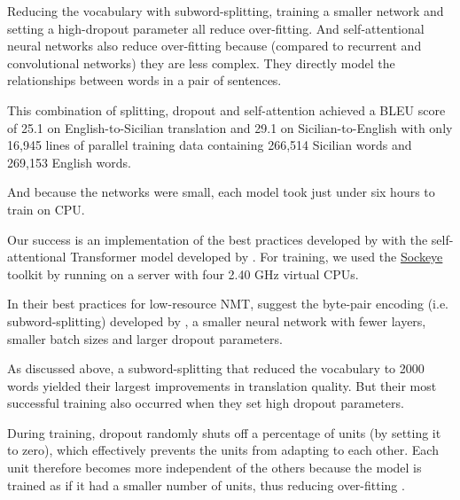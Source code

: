 \documentclass[10pt,letterpaper]{article}
\begin{document}
Reducing the vocabulary with subword-splitting,
training a smaller network and setting a high-dropout parameter all reduce over-fitting.
And self-attentional neural networks also reduce over-fitting because
(compared to recurrent and convolutional networks) they are less complex.  They
directly model the relationships between words in a pair of sentences.

This combination of splitting, dropout and self-attention achieved a BLEU score of
25.1 on English-to-Sicilian translation and 29.1 on Sicilian-to-English with only 16,945 lines
of parallel training data containing 266,514 Sicilian words and 269,153 English words.

And because the networks were small, each model took just under six hours to train on CPU.
      
Our success is an implementation of the best practices developed by \citet{sennrich2019loresnmt}
with the self-attentional Transformer model developed by \citet{vaswani2017attention}.
For training, we used the \href{https://awslabs.github.io/sockeye/}{Sockeye} toolkit by
\citet{hieber2017sockeye} running on a server with four 2.40 GHz virtual CPUs.
      
In their best practices for low-resource NMT, \citeauthor{sennrich2019loresnmt}
suggest the byte-pair encoding (i.e. subword-splitting) developed by 
\citep{sennrich2016subword}, a smaller neural network with fewer layers,
smaller batch sizes and larger dropout parameters.

      

As discussed above, a subword-splitting that reduced the vocabulary to
2000 words yielded their largest improvements in translation quality.
But their most successful training also occurred when they set high dropout parameters.

During training, dropout randomly shuts off a percentage of units (by setting it to zero),
which effectively prevents the units from adapting to each other.
Each unit therefore becomes more independent of the others because the model is trained
as if it had a smaller number of units, thus reducing over-fitting
\citep{srivastava2014dropout}.
\end{document}
